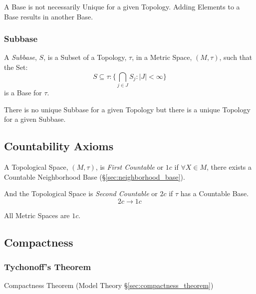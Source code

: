 A Base is not necessarily Unique for a given Topology. Adding Elements
to a Base results in another Base.



\subsubsection{Subbase}

A \emph{Subbase}, $S$, is a Subset of a Topology, $\tau$, in a Metric
Space, $(M,\tau)$, such that the Set:
\[
    S \subseteq \tau : \{ \bigcap_{j \in J} S_j : |J| < \infty \}
\]
is a Base for $\tau$.

There is no unique Subbase for a given Topology but there is a unique
Topology for a given Subbase.



\subsection{Countability Axioms}\label{sec:countability_axioms}

A Topological Space, $(M,\tau)$, is \emph{First Countable} or $1c$ if
$\forall X \in M$, there exists a Countable Neighborhood Base
(\S\ref{sec:neighborhood_base}).

And the Topological Space is \emph{Second Countable} or $2c$ if $\tau$
has a Countable Base.
\[
    2c \rightarrow 1c
\]

All Metric Spaces are $1c$.



\subsection{Compactness}\label{sec:compactness}

\subsubsection{Tychonoff's Theorem}\label{sec:tychonoffs_theorem}

Compactness Theorem (Model Theory \S\ref{sec:compactness_theorem})




